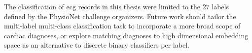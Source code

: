 \documentclass[\main/thesis.tex]{subfiles}
\begin{document}
The classification of \gls{ecg} records in this thesis were limited to the 27 labels defined by the PhysioNet challenge organizers.
Future work should tailor the multi-label multi-class classification task to incorporate a more broad scope of cardiac diagnoses, or explore matching diagnoses to high dimensional embedding space as an alternative to discrete binary classifiers per label.
\end{document}
